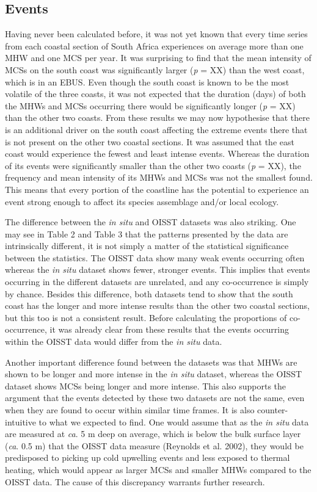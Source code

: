 \documentclass[a4paper,10pt,review]{elsarticle}
\begin{document}
\subsection{Events}
Having never been calculated before, it was not yet known that every time series from each coastal section of South Africa experiences on average more than one MHW and one MCS per year. It was surprising to find that the mean intensity of MCSs on the south coast was significantly larger (\emph{p} = XX) than the west coast, which is in an EBUS. Even though the south coast is known to be the most volatile of the three coasts, it was not expected that the duration (days) of both the MHWs and MCSs occurring there would be significantly longer (\emph{p} = XX) than the other two coasts. From these results we may now hypothesise that there is an additional driver on the south coast affecting the extreme events there that is not present on the other two coastal sections. It was assumed that the east coast would experience the fewest and least intense events. Whereas the duration of its events were significantly smaller than the other two coasts (\emph{p} = XX), the frequency and mean intensity of its MHWs and MCSs was not the smallest found. This means that every portion of the coastline has the potential to experience an event strong enough to affect its species assemblage and/or local ecology.

The difference between the \emph{in situ} and OISST datasets was also striking. One may see in Table 2 and Table 3 that the patterns presented by the data are intrinsically different, it is not simply a matter of the statistical significance between the statistics. The OISST data show many weak events occurring often whereas the \emph{in situ} dataset shows fewer, stronger events. This implies that events occurring in the different datasets are unrelated, and any co-occurrence is simply by chance. Besides this difference, both datasets tend to show that the south coast has the longer and more intense results than the other two coastal sections, but this too is not a consistent result. Before calculating the proportions of co-occurrence, it was already clear from these results that the events occurring within the OISST data would differ from the \emph{in situ} data.

Another important difference found between the datasets was that MHWs are shown to be longer and more intense in the \emph{in situ} dataset, whereas the OISST dataset shows MCSs being longer and more intense. This also supports the argument that the events detected by these two datasets are not the same, even when they are found to occur within similar time frames. It is also counter-intuitive to what we expected to find. One would assume that as the \emph{in situ} data are measured at \emph{ca}. 5 m deep on average, which is below the bulk surface layer (\emph{ca}. 0.5 m) that the OISST data measure (Reynolds et al. 2002), they would be predisposed to picking up cold upwelling events and less exposed to thermal heating, which would appear as larger MCSs and smaller MHWs compared to the OISST data. The cause of this discrepancy warrants further research.
\end{document}
